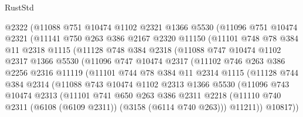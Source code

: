 \begin{lexlean}{RustStd}
\begin{coremodule}
{\begin{coremodule}
{{{{{{{{{{{{{{{{{{{{{{{{{{          @2322
          (@11088
            @751
            @10474
            @1102
            @2321
            @1366
            @5530
            (@11096
              @751
              @10474
              @2321
              (@11141
                @750
                @263
                @386
                @2167
                @2320
                @11150
                (@11101
                  @748
                  @78
                  @384
                  @11
                  @2318
                  @1115
                  (@11128
                    @748
                    @384
                    @2318
                    (@11088
                      @747
                      @10474
                      @1102
                      @2317
                      @1366
                      @5530
                      (@11096
                        @747
                        @10474
                        @2317
                        (@11102
                          @746
                          @263
                          @386
                          @2256
                          @2316
                          @11119
                          (@11101
                            @744
                            @78
                            @384
                            @11
                            @2314
                            @1115
                            (@11128
                              @744
                              @384
                              @2314
                              (@11088
                                @743
                                @10474
                                @1102
                                @2313
                                @1366
                                @5530
                                (@11096
                                  @743
                                  @10474
                                  @2313
                                  (@11101
                                    @741
                                    @650
                                    @263
                                    @386
                                    @2311
                                    @2218
                                    (@11110
                                      @740
                                      @2311
                                      (@6108 (@6109 @2311))
                                      (@3158 (@6114 @740 @263)))
                                    @11211))
                                @10817))
}}}}}}}}}}}}}}}}}}}}}}}}}}
\end{coremodule}}
\end{coremodule}
\end{lexlean}
